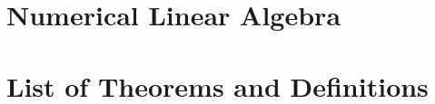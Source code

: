 \documentclass[oneside]{book}
\begin{document}
\chapter{Numerical Linear Algebra} \label{appendix:c}

    

\pagebreak

\backmatter

\chapter{List of Theorems and Definitions}

    

\pagebreak

\end{document}
